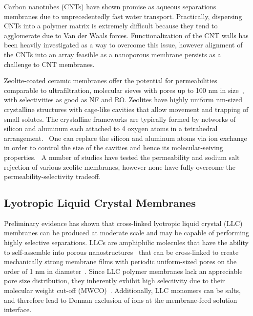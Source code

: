 \documentclass{article}
\begin{document}
  Carbon nanotubes (CNTs) have shown promise as aqueous separations membranes
  due to unprecedentedly fast water transport.\cite{humplik_nanostructured_2011,hummer_water_2001} 
  Practically, dispersing CNTs into a polymer matrix is extremely difficult
  because they tend to agglomerate due to Van der Waals forces. Functionalization
  of the CNT walls has been heavily investigated  as a way to overcome this issue, however 
  alignment of the CNTs into an array feasible as a nanoporous membrane 
  persists as a challenge to CNT membranes.\cite{sahoo_polymer_2010}
   
  Zeolite-coated ceramic membranes offer the potential for permeabilities
  comparable to ultrafiltration, molecular sieves with pores up to 100 nm in 
  size~\cite{werber_materials_2016}, with selectivities as good as NF and RO. 
  Zeolites have highly uniform nm-sized crystalline structures with cage-like
  cavities that allow movement and trapping of small solutes. The crystalline
  frameworks are typically formed by networks of silicon and aluminum each 
  attached to 4 oxygen atoms in a tetrahedral arrangement.~\cite{auerbach_handbook_2003}
  One can replace the silicon and aluminum atoms via ion exchange in order to
  control the size of the cavities and hence its molecular-seiving properties.~\cite{li_novel_2007}
  A number of studies have tested the permeability and sodium salt rejection
  of various zeolite membranes, however none have fully overcome the 
  permeability-selectivity tradeoff.~\cite{pendergast_review_2011}

  \subsection*{Lyotropic Liquid Crystal Membranes}
  
  Preliminary evidence has shown that cross-linked lyotropic liquid crystal
  (LLC) membranes can be produced at moderate scale and may be capable of 
  performing highly selective separations. LLCs are amphiphilic molecules 
  that have the ability to self-assemble into porous nanostructures~\cite{smith_ordered_1997}
  that can be cross-linked to create mechanically strong membrane films with 
  periodic uniform-sized pores on the order of 1 nm in diameter~\cite{zhou_supported_2005}. 
  Since LLC polymer membranes lack an appreciable pore size distribution, they 
  inherently exhibit high selectivity due to their molecular weight cut-off 
  (MWCO)~\cite{zhou_supported_2005}. Additionally, LLC monomers can be salts,
  and therefore lead to Donnan exclusion of ions at the membrane-feed solution 
  interface.\cite{donnan_theory_1995}
\end{document}
